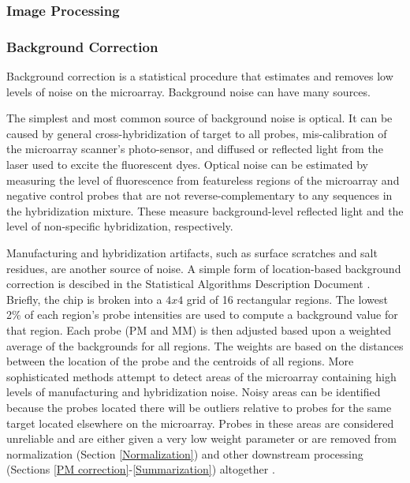 \subsubsection{Image Processing}
\label{Image Processing}

\subsubsection{Background Correction}
\label{Background Correction}

Background correction is a statistical procedure that estimates and removes low
levels of noise on the microarray.  Background noise can have many sources.

The simplest and most common source of background noise is optical.  It can be
caused by general cross-hybridization of target to all probes, mis-calibration
of the microarray scanner's photo-sensor, and diffused or reflected light from
the laser used to excite the fluorescent dyes.  Optical noise can be estimated
by measuring the level of fluorescence from featureless regions of the
microarray and negative control probes that are not reverse-complementary to
any sequences in the hybridization mixture.  These measure background-level
reflected light and the level of non-specific hybridization, respectively.

Manufacturing and hybridization artifacts, such as surface scratches and salt
residues, are another source of noise.  A simple form of location-based
background correction is descibed in the Statistical Algorithms Description
Document \cite{affy:tech:2002}.   Briefly, the chip is broken into a $4x4$
grid of 16 rectangular regions.  The lowest 2\% of each region's probe
intensities are used to compute a background value for that region.  Each probe
(PM and MM) is then adjusted based upon a weighted average of the backgrounds
for all regions. The weights are based on the distances between the location of
the probe and the centroids of all regions.  More sophisticated methods attempt
to detect areas of the microarray containing high levels of manufacturing and
hybridization noise.  Noisy areas can be identified because the probes located
there will be outliers relative to probes for the same target located elsewhere
on the microarray.  Probes in these areas are considered unreliable and are
either given a very low weight parameter or are removed from normalization
(Section \ref{Normalization}) and other downstream processing (Sections \ref{PM
correction}-\ref{Summarization}) altogether \cite{affyplm}.

